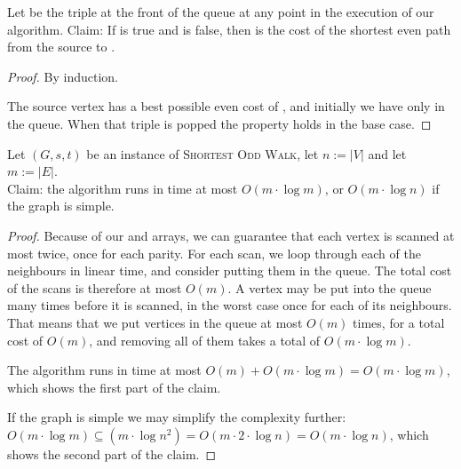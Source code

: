 \begin{theorem}
    Let  be the triple at the front of the queue at any point in the execution of our algorithm.
    Claim: If  is true and  is false, then  is the cost of the shortest even path from the source to .

    \begin{proof}
    By induction. 

    The source vertex  has a best possible even cost of , and initially we have only  in the queue. When that triple is popped the property holds in the base case.


    \end{proof}
\end{theorem}

\begin{theorem}
    Let $(G,s,t)$ be an instance of \textsc{Shortest Odd Walk}, let $n := |V|$ and let $m := |E|$.\\
    Claim: the algorithm runs in time at most $O(m \cdot \log m)$, or $O(m \cdot \log n)$ if the graph is simple.
    \begin{proof}
        Because of our  and  arrays, we can guarantee that each vertex is scanned at most twice, once for each parity. For each scan, we loop through each of the neighbours in linear time, and consider putting them in the queue. The total cost of the scans is therefore at most $O(m)$. A vertex may be put into the queue many times before it is scanned, in the worst case once for each of its neighbours. That means that we put vertices in the queue at most $O(m)$ times, for a total cost of $O(m)$, and removing all of them takes a total of $O(m \cdot \log m)$. 
        
        The algorithm runs in time at most $O(m) + O(m \cdot \log m) = O(m \cdot \log m)$, which shows the first part of the claim.
        
        If the graph is simple we may simplify the complexity further: $O(m \cdot \log m) \subseteq (m \cdot \log n^2) = O(m \cdot 2 \cdot \log n) = O(m \cdot \log n)$, which shows the second part of the claim.
    \end{proof}
\end{theorem}

